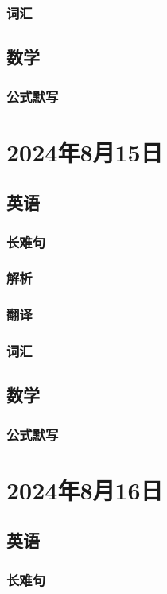 \documentclass[UTF8]{ctexart}
\begin{document}
\subsubsection{词汇}
\subsection{数学}
\subsubsection{公式默写}
\begin{multicols}{2}
\end{multicols}
\section{2024年8月15日}
\subsection{英语}
\subsubsection{长难句}
\subsubsection{解析}
\subsubsection{翻译}
\subsubsection{词汇}
\subsection{数学}
\subsubsection{公式默写}
\begin{multicols}{2}
\end{multicols}
\section{2024年8月16日}
\subsection{英语}
\subsubsection{长难句}
\end{document}
